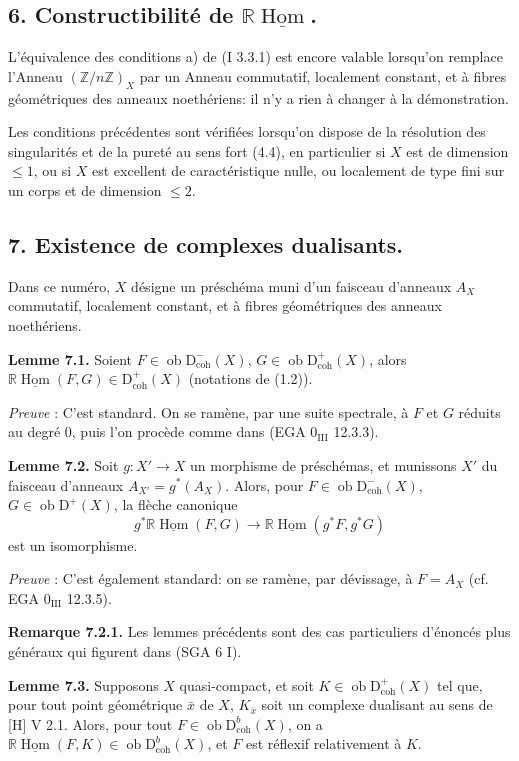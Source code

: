 \documentclass[11pt]{article}
\DeclareMathOperator{\Hom}{Hom}
\newcommand{\R}{\mathbb{R}}\newcommand{\RHomCore}{\mathbb{R}\mathrm{Hom}}
\newcommand{\D}{\mathrm{D}}
\newcommand{\Z}{\mathbb{Z}}
\newcommand{\ob}{\operatorname{ob}}
\providecommand{\Hom}{\operatorname{Hom}}
\providecommand{\ob}{\operatorname{ob}}
\providecommand{\R}{\mathrm R}
\providecommand{\Z}{\mathbb Z}
\providecommand{\Hom}{\operatorname{Hom}}
\begin{document}
\subsection*{6. Constructibilité de $\R\underline{\Hom}$.}

L'équivalence des conditions a) de (I 3.3.1) est encore valable lorsqu'on remplace l'Anneau $(\Z/n\Z)_X$ par un Anneau commutatif, localement constant, et à fibres géométriques des anneaux noethériens: il n'y a rien à changer à la démonstration.

Les conditions précédentes sont vérifiées lorsqu'on dispose de la résolution des singularités et de la pureté au sens fort (4.4), en particulier si $X$ est de dimension $\leq1$, ou si $X$ est excellent de caractéristique nulle, ou localement de type fini sur un corps et de dimension $\leq2$.

\subsection*{7. Existence de complexes dualisants.}

Dans ce numéro, $X$ désigne un préschéma muni d'un faisceau d'anneaux $A_X$ commutatif, localement constant, et à fibres géométriques des anneaux noethériens.

\textbf{Lemme 7.1.} Soient $F\in\ob\D^{-}_{\mathrm{coh}}(X)$, $G\in\ob\D^{+}_{\mathrm{coh}}(X)$, alors $\R\underline{\Hom}(F,G)\in\D^{+}_{\mathrm{coh}}(X)$ (notations de (1.2)).

\emph{Preuve} : C'est standard. On se ramène, par une suite spectrale, à $F$ et $G$ réduits au degré $0$, puis l'on procède comme dans (EGA $0_{\mathrm{III}}$ 12.3.3).

\textbf{Lemme 7.2.} Soit $g:X'\to X$ un morphisme de préschémas, et munissons $X'$ du faisceau d'anneaux $A_{X'}=g^*(A_X)$. Alors, pour $F\in\ob\D^{-}_{\mathrm{coh}}(X)$, $G\in\ob\D^{+}(X)$, la flèche canonique
\[
        g^*\R\underline{\Hom}(F,G)\longrightarrow \R\underline{\Hom}(g^*F,g^*G)
\]
est un isomorphisme.

\emph{Preuve} : C'est également standard: on se ramène, par dévissage, à $F=A_X$ (cf. EGA $0_{\mathrm{III}}$ 12.3.5).

\textbf{Remarque 7.2.1.} Les lemmes précédents sont des cas particuliers d'énoncés plus généraux qui figurent dans (SGA 6 I).

\textbf{Lemme 7.3.} Supposons $X$ quasi-compact, et soit $K\in\ob\D^{+}_{\mathrm{coh}}(X)$ tel que, pour tout point géométrique $\bar{x}$ de $X$, $K_{\bar{x}}$ soit un complexe dualisant au sens de [H] V 2.1. Alors, pour tout $F\in\ob\D^{b}_{\mathrm{coh}}(X)$, on a $\R\underline{\Hom}(F,K)\in\ob\D^{b}_{\mathrm{coh}}(X)$, et $F$ est réflexif relativement à $K$.
\end{document}
